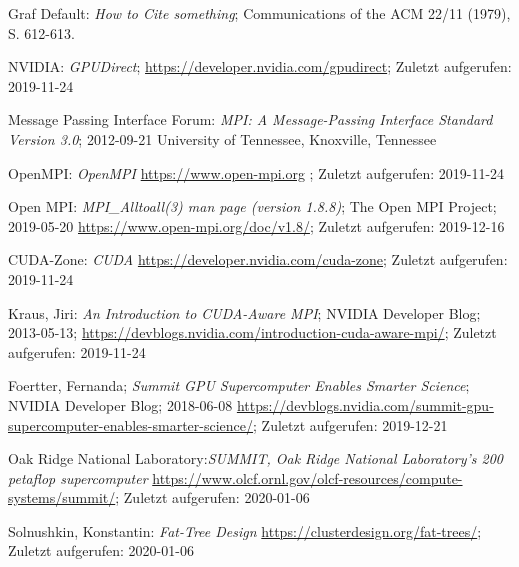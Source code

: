         Graf Default: {\sl How to Cite something}; 
        Communications of the ACM 22/11 (1979), S. 612-613.

		NVIDIA: {\sl GPUDirect};
		\url{https://developer.nvidia.com/gpudirect}; Zuletzt aufgerufen: 2019-11-24


		Message Passing Interface Forum: {\sl MPI: A Message-Passing Interface Standard Version 3.0}; 2012-09-21
		University of Tennessee, Knoxville, Tennessee

		OpenMPI: {\sl OpenMPI}
		\url{https://www.open-mpi.org} ; Zuletzt aufgerufen: 2019-11-24

		Open MPI: {\sl MPI\_Alltoall(3) man page (version 1.8.8)};
		The Open MPI Project; 2019-05-20
		\url {https://www.open-mpi.org/doc/v1.8/}; Zuletzt aufgerufen: 2019-12-16

		CUDA-Zone: {\sl CUDA}
		\url{https://developer.nvidia.com/cuda-zone}; Zuletzt aufgerufen: 2019-11-24

		Kraus, Jiri: {\sl An Introduction to CUDA-Aware MPI};
		NVIDIA Developer Blog; 2013-05-13;	
		\url{https://devblogs.nvidia.com/introduction-cuda-aware-mpi/}; Zuletzt aufgerufen: 2019-11-24

		Foertter, Fernanda; {\sl Summit GPU Supercomputer Enables Smarter Science}; NVIDIA Developer Blog; 2018-06-08
		\url{https://devblogs.nvidia.com/summit-gpu-supercomputer-enables-smarter-science/}; Zuletzt aufgerufen: 2019-12-21

		Oak Ridge National Laboratory:{\sl SUMMIT, Oak Ridge National Laboratory's 200 petaflop supercomputer}
		\url{https://www.olcf.ornl.gov/olcf-resources/compute-systems/summit/}; Zuletzt aufgerufen: 2020-01-06

		Solnushkin, Konstantin: {\sl Fat-Tree Design}
		\url{https://clusterdesign.org/fat-trees/}; Zuletzt aufgerufen: 2020-01-06
